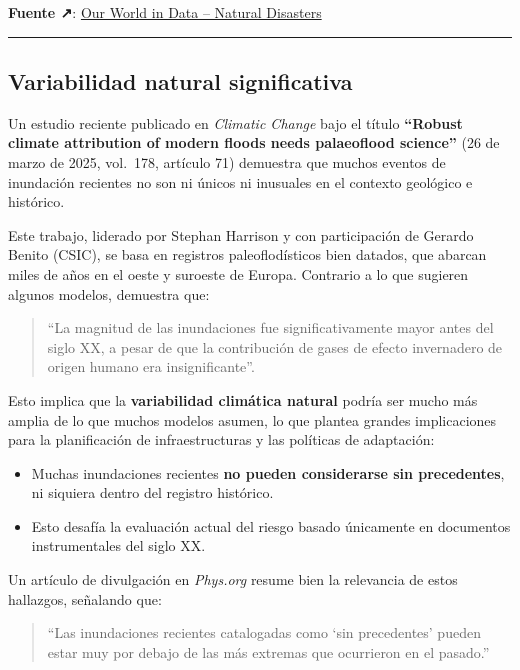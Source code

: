 \documentclass[
  11pt,
  a4paper,
  DIV=11,
  numbers=noendperiod]{scrreprt}
\providecommand{\tightlist}{%
  \setlength{\itemsep}{0pt}\setlength{\parskip}{0pt}}
\begin{document}
\textbf{Fuente ↗}:
\href{https://ourworldindata.org/natural-disasters}{Our World in Data --
Natural Disasters}

\begin{center}\rule{0.5\linewidth}{0.5pt}\end{center}

\subsection{Variabilidad natural
significativa}\label{variabilidad-natural-significativa}

Un estudio reciente publicado en \emph{Climatic Change} bajo el título
\textbf{``Robust climate attribution of modern floods needs palaeoflood
science''} (26 de marzo de 2025, vol.~178, artículo 71) demuestra que
muchos eventos de inundación recientes no son ni únicos ni inusuales en
el contexto geológico e histórico.

Este trabajo, liderado por Stephan Harrison y con participación de
Gerardo Benito (CSIC), se basa en registros paleoflodísticos bien
datados, que abarcan miles de años en el oeste y suroeste de Europa.
Contrario a lo que sugieren algunos modelos, demuestra que:

\begin{quote}
``La magnitud de las inundaciones fue significativamente mayor antes del
siglo XX, a pesar de que la contribución de gases de efecto invernadero
de origen humano era insignificante''.
\end{quote}

Esto implica que la \textbf{variabilidad climática natural} podría ser
mucho más amplia de lo que muchos modelos asumen, lo que plantea grandes
implicaciones para la planificación de infraestructuras y las políticas
de adaptación:

\begin{itemize}
\tightlist
\item
  Muchas inundaciones recientes \textbf{no pueden considerarse sin
  precedentes}, ni siquiera dentro del registro histórico.
\item
  Esto desafía la evaluación actual del riesgo basado únicamente en
  documentos instrumentales del siglo XX.
\end{itemize}

Un artículo de divulgación en \emph{Phys.org} resume bien la relevancia
de estos hallazgos, señalando que:

\begin{quote}
``Las inundaciones recientes catalogadas como `sin precedentes' pueden
estar muy por debajo de las más extremas que ocurrieron en el pasado.''
\end{quote}
\end{document}
